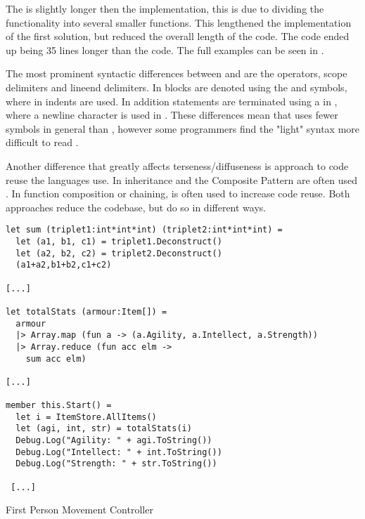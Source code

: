 The \fs is slightly longer then the \cs implementation, this is due to dividing the functionality into several smaller functions. This lengthened the implementation of the first solution, but reduced the overall length of the code. The \cs code ended up being 35 lines longer than the \fs code. The full examples can be seen in .

The most prominent syntactic differences between \cs and \fs are the operators, scope delimiters and lineend delimiters. In \cs blocks are denoted using the \m{\{} and \m{\}} symbols, where in \fs indents are used. In addition statements are terminated using a \m{;} in \cs, where a newline character is used in \fs. These differences mean that \fs uses fewer symbols in general than \cs, however some programmers find the "light" syntax more difficult to read \needcite.

Another difference that greatly affects terseness/diffuseness is approach to code reuse the languages use. In \cs inheritance and the Composite Pattern \needcite are often used \needcite. In \fs function composition or chaining, is often used to increase code reuse. Both approaches reduce the codebase, but do so in different ways.

\begin{listing}[H]
\begin{verbatim}
let sum (triplet1:int*int*int) (triplet2:int*int*int) =
  let (a1, b1, c1) = triplet1.Deconstruct()
  let (a2, b2, c2) = triplet2.Deconstruct()
  (a1+a2,b1+b2,c1+c2)

[...]

let totalStats (armour:Item[]) =
  armour
  |> Array.map (fun a -> (a.Agility, a.Intellect, a.Strength))
  |> Array.reduce (fun acc elm ->
    sum acc elm)

[...]

member this.Start() =
  let i = ItemStore.AllItems()
  let (agi, int, str) = totalStats(i)
  Debug.Log("Agility: " + agi.ToString())
  Debug.Log("Intellect: " + int.ToString())
  Debug.Log("Strength: " + str.ToString())

 [...]
\end{verbatim}
\caption{First Person Movement Controller \fs}
\label{lst:fs-armour}
\end{listing}

